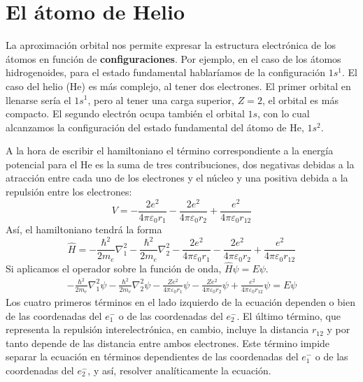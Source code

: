 \section{El átomo de Helio}
La aproximación orbital nos permite expresar la estructura electrónica
de los átomos en función de \textbf{configuraciones}. Por ejemplo, en el caso 
de los átomos hidrogenoides, para el estado fundamental hablaríamos de la 
configuración $1s^1$. El caso del helio (He) es más complejo, al tener dos 
electrones. El primer orbital en llenarse sería el $1s^1$, pero al tener
una carga superior, $Z=2$, el orbital es más compacto. El segundo electrón
ocupa también el orbital $1s$, con lo cual alcanzamos la configuración del
estado fundamental del átomo de He, $1s^2$.

A la hora de escribir el hamiltoniano el término correspondiente a la
energía potencial para el He es la suma de tres contribuciones, dos 
negativas debidas a la atracción entre cada uno de los electrones y
el núcleo y una positiva debida a la repulsión entre los electrones:
\begin{equation}
        V= -\frac{2e^2}{4\pi \varepsilon_0r_1} -\frac{2e^2}{4\pi \varepsilon_0r_2} + \frac{e^2}{4\pi \varepsilon_0r_{12}} 
\end{equation}
Así, el hamiltoniano tendrá la forma
\begin{equation}
    \hat{H}=  -\frac{\hbar^2}{2m_e}\nabla_1^2 -\frac{\hbar^2}{2m_e}\nabla_2^2 -\frac{2e^2}{4\pi \varepsilon_0r_1} -\frac{2e^2}{4\pi \varepsilon_0r_2} + \frac{e^2}{4\pi \varepsilon_0r_{12}}
\end{equation}
Si aplicamos el operador sobre la función de onda, $\hat{H}\psi=E\psi$.
\begin{align}
    -\frac{\hbar^2}{2m_e}\nabla_1^2\psi 
    -\frac{\hbar^2}{2m_e}\nabla_2^2\psi 
    -\frac{Ze^2}{4\pi \varepsilon_0r_1}\psi 
    -\frac{Ze^2}{4\pi \varepsilon_0r_2}\psi 
    + \frac{e^2}{4\pi \varepsilon_0r_{12}}\psi 
    = E\psi
    \label{eq:he_exact}    
\end{align}
Los cuatro primeros términos en el lado izquierdo de la ecuación 
dependen o bien de las coordenadas del $e^-_1$ o de las coordenadas 
del $e^-_2$. El último término, que representa la repulsión interelectrónica,
en cambio, incluye la distancia $r_{12}$ y por tanto depende de las distancia entre ambos electrones. Este término impide separar la ecuación en términos 
dependientes de las coordenadas del $e^-_1$ o de las coordenadas 
del $e^-_2$, y así, resolver analíticamente la ecuación. 

